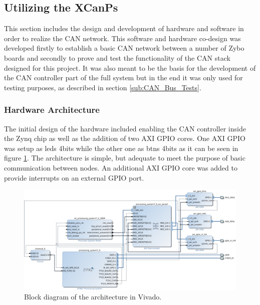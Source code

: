\subsection{Utilizing the XCanPs}
\label{sub:TestingCANStack_BareMetal}
This section includes the design and development of hardware and software in order to realize the CAN network.
This software and hardware co-design was developed firstly to establish a basic CAN network between a number of Zybo boards and secondly to prove and test the functionality of the CAN stack designed for this project.
It was also meant to be the basis for the development of the CAN controller part of the full system but in the end it was only used for testing purposes, as described in section \ref{sub:CAN_Bus_Tests}.

\subsubsection*{Hardware Architecture}
The initial design of the hardware included enabling the CAN controller inside the Zynq chip as well as the addition of two AXI GPIO cores.
One AXI GPIO was setup as leds 4bits while the other one as btns 4bits as it can be seen in figure \ref{fig:CAN_Testing_Architecture}.
The architecture is simple, but adequate to meet the purpose of basic communication between nodes.
An additional AXI GPIO core was added to provide interrupts on an external GPIO port.

\begin{figure}[h!]
	\centering
	\includegraphics[width = 1.1\linewidth]{graphics/Zybo_BasicTestingArchitecture_for_CAN.png}
	\caption{Block diagram of the architecture in Vivado.}
	\label{fig:CAN_Testing_Architecture}
\end{figure}

